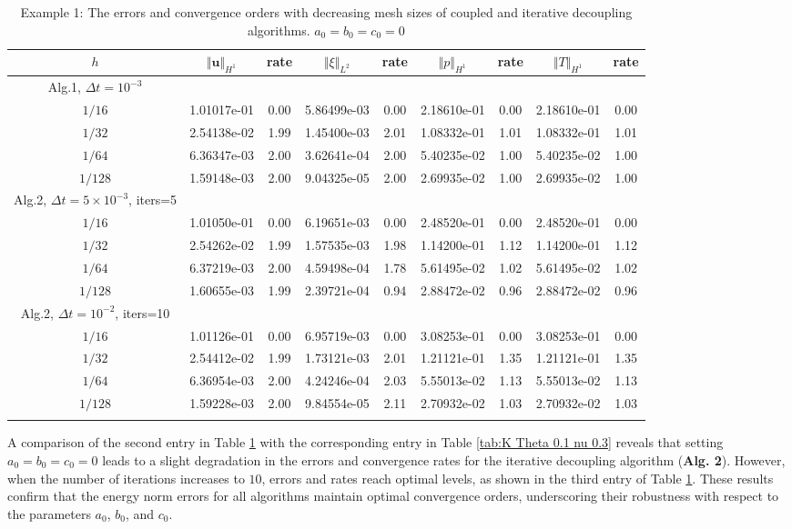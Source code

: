 \documentclass{article}
\numberwithin{equation}{section}
\begin{document}
\begin{table}[htbp]\tiny 
\caption{Example 1: The errors and convergence orders with decreasing mesh sizes of
 coupled and iterative decoupling algorithms. $a_0=b_0= c_0=0$ }
\centering
\begin{tabular}{ccccccccc}
\toprule
  $h$&$\Vert\bm u\Vert_{H^1}$ &rate &$\Vert\xi\Vert_{L^2}$ &rate &$\Vert p\Vert_{H^1}$ &rate&$\Vert T\Vert_{H^1}$ &rate \\ 
\midrule
Alg.1, $\Delta t=10^{-3}$\\
\midrule
$1/16$ & 1.01017e-01 & 0.00 & 5.86499e-03 & 0.00 & 2.18610e-01 & 0.00 & 2.18610e-01 & 0.00 \\
$1/32$ & 2.54138e-02 & 1.99 & 1.45400e-03 & 2.01 & 1.08332e-01 & 1.01 & 1.08332e-01 & 1.01 \\
$1/64$ & 6.36347e-03 & 2.00 & 3.62641e-04 & 2.00 & 5.40235e-02 & 1.00 & 5.40235e-02 & 1.00 \\
$1/128$ & 1.59148e-03 & 2.00 & 9.04325e-05 & 2.00 & 2.69935e-02 & 1.00 & 2.69935e-02 & 1.00 \\
\midrule
Alg.2, $\Delta t=5\times 10^{-3}$, iters=5 &\\
\midrule
$1/16$ & 1.01050e-01 & 0.00 & 6.19651e-03 & 0.00 & 2.48520e-01 & 0.00 & 2.48520e-01 & 0.00 \\
$1/32$ & 2.54262e-02 & 1.99 & 1.57535e-03 & 1.98 & 1.14200e-01 & 1.12 & 1.14200e-01 & 1.12 \\
$1/64$ & 6.37219e-03 & 2.00 & 4.59498e-04 & 1.78 & 5.61495e-02 & 1.02 & 5.61495e-02 & 1.02 \\
$1/128$ & 1.60655e-03 & 1.99 & 2.39721e-04 & 0.94 & 2.88472e-02 & 0.96 & 2.88472e-02 & 0.96 \\
\midrule
Alg.2, $\Delta t=10^{-2}$, iters=10 &\\
\midrule
$1/16$ & 1.01126e-01 & 0.00 & 6.95719e-03 & 0.00 & 3.08253e-01 & 0.00 & 3.08253e-01 & 0.00 \\
$1/32$ & 2.54412e-02 & 1.99 & 1.73121e-03 & 2.01 & 1.21121e-01 & 1.35 & 1.21121e-01 & 1.35 \\
$1/64$ & 6.36954e-03 & 2.00 & 4.24246e-04 & 2.03 & 5.55013e-02 & 1.13 & 5.55013e-02 & 1.13 \\
$1/128$ & 1.59228e-03 & 2.00 & 9.84554e-05 & 2.11 & 2.70932e-02 & 1.03 & 2.70932e-02 & 1.03 \\
\bottomrule
 \label{tab:a0=b0=c0=0}
\end{tabular}
\end{table} 

A comparison of the second entry in Table \ref{tab:a0=b0=c0=0} with the corresponding entry in Table \ref{tab:K Theta 0.1 nu 0.3} reveals that setting \(a_0 = b_0 = c_0 = 0\) leads to a slight degradation in the errors and convergence rates for the iterative decoupling algorithm (\textbf{Alg. 2}). However, when the number of iterations increases to \(10\), errors and rates reach optimal levels, as shown in the third entry of Table \ref{tab:a0=b0=c0=0}. These results confirm that the energy norm errors for all algorithms maintain optimal convergence orders, underscoring their robustness with respect to the parameters \(a_0\), \(b_0\), and \(c_0\).
\end{document}
